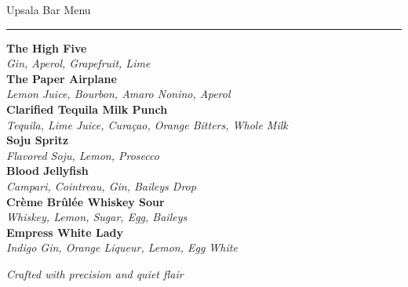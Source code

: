 \documentclass[12pt]{article}
\newcommand{\cocktail}[2]{
  \textbf{\large #1} \\ 
  \small\textit{#2} \vspace{1em} \\
}
\begin{document}
\begin{center}
    {\headingfont\LARGE Upsala Bar Menu}\\
    \vspace{0.5em}
    \rule{0.2\textwidth}{0.4pt}
\end{center}

\vspace{2em}

\cocktail{The High Five}{Gin, Aperol, Grapefruit, Lime}

\cocktail{The Paper Airplane}{Lemon Juice, Bourbon, Amaro Nonino, Aperol}

\cocktail{Clarified Tequila Milk Punch}{Tequila, Lime Juice, Curaçao, Orange Bitters, Whole Milk}

\cocktail{Soju Spritz}{Flavored Soju, Lemon, Prosecco}

\cocktail{Blood Jellyfish}{Campari, Cointreau, Gin, Baileys Drop}

\cocktail{Crème Brûlée Whiskey Sour}{Whiskey, Lemon, Sugar, Egg, Baileys}

\cocktail{Empress White Lady}{Indigo Gin, Orange Liqueur, Lemon, Egg White}

\vfill

\begin{center}
    {\small\itshape Crafted with precision and quiet flair}
\end{center}
\end{document}
